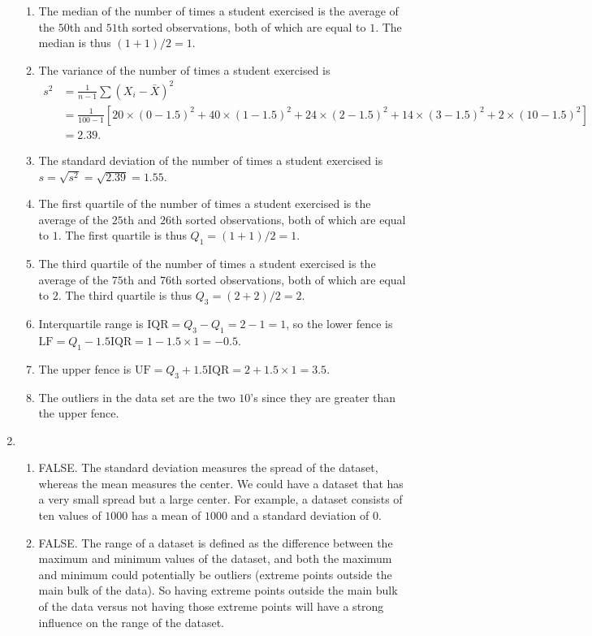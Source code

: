\documentclass{article}
\begin{document}
\begin{enumerate}
\begin{enumerate}
        \item The median of the number of times a student exercised is the average of the $50$th and $51$th sorted observations, both of which are equal to $1$. The median is thus $(1+1)/2=1$.
        \item The variance of the number of times a student exercised is
    \begin{align*}
        s^2&=\frac{1}{n-1}\sum(X_i-\bar{X})^2\\&=\frac{1}{100-1}[20\times(0-1.5)^2+40\times(1-1.5)^2+24\times(2-1.5)^2+14\times(3-1.5)^2+2\times(10-1.5)^2]\\&=2.39.
    \end{align*}
        \item The standard deviation of the number of times a student exercised is $s=\sqrt{s^2}=\sqrt{2.39}=1.55$.
        \item The first quartile of the number of times a student exercised is the average of the $25$th and $26$th sorted observations, both of which are equal to $1$. The first quartile is thus $Q_1=(1+1)/2=1$.
        \item The third quartile of the number of times a student exercised is the average of the $75$th and $76$th sorted observations, both of which are equal to $2$. The third quartile is thus $Q_3=(2+2)/2=2$.
        \item Interquartile range is $\mathrm{IQR}=Q_3-Q_1=2-1=1$, so the lower fence is $\mathrm{LF}=Q_1-1.5\mathrm{IQR}=1-1.5\times1=-0.5$.
        \item The upper fence is $\mathrm{UF}=Q_3+1.5\mathrm{IQR}=2+1.5\times1=3.5$.
        \item The outliers in the data set are the two $10$'s since they are greater than the upper fence.
    \end{enumerate}
    \item 
    \begin{enumerate}
        \item FALSE. The standard deviation measures the spread of the dataset, whereas the mean measures the center. We could have a dataset that has a very small spread but a large center. For example, a dataset consists of ten values of $1000$ has a mean of $1000$ and a standard deviation of $0$.
        \item FALSE. The range of a dataset is defined as the difference between the maximum and minimum values of the dataset, and both the maximum and minimum could potentially be outliers (extreme points outside the main bulk of the data). So having extreme points outside the main bulk of the data versus not having those extreme points will have a strong influence on the range of the dataset.

\end{enumerate}
\end{enumerate}
\end{document}
